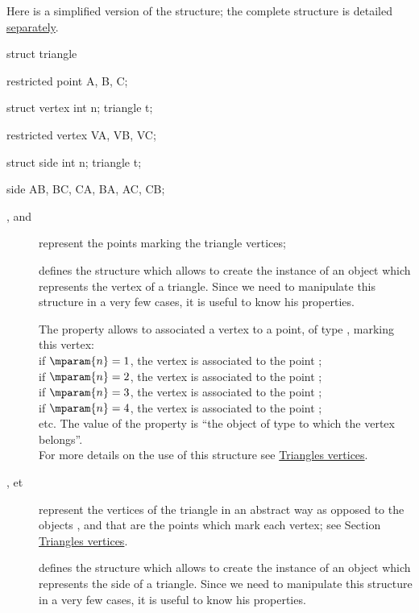 \documentclass[pdftex]{article}
\begin{document}
Here is a simplified version of the  structure; the
complete structure is detailed \href{http://piprim.tuxfamily.org/asymptote/geometry/modules/geometry.asy.index.sign.html#struct\%20triangle}{separately}.
\begin{center}
  \begin{Vcolor}
    struct triangle {
      restricted point A, B, C;

      struct vertex {
        int n;
        triangle t; }

      restricted vertex VA, VB, VC;

      struct side {
        int n;
        triangle t; }

      side AB, BC, CA, BA, AC, CB; }
  \end{Vcolor}
\end{center}
\begin{description}
\item[,  and ] represent the points marking
  the triangle vertices;
\item[] defines the  structure which
  allows to create the instance of an object which represents the
  vertex of a triangle. Since we need to manipulate this structure in
  a very few cases, it is useful to know his properties.

  The property  allows to associated a vertex to a point, of
  type , marking this vertex:\\
  if $\mparam{n}=1$, the vertex is associated to the
  point ;\\
  if $\mparam{n}=2$, the vertex is associated to the
  point ;\\
  if $\mparam{n}=3$, the vertex is associated to the
  point ;\\
  if $\mparam{n}=4$, the vertex is associated to the
  point ;\\
  etc.
  The value of the property  is ``the object of type
   to which the vertex belongs''.\\
  For more details on the use of this structure see
  \href{#subsection.vertex}{Triangles vertices}.
\item[,  et ] represent the vertices of
  the triangle in an abstract way as opposed to the objects
   ,  and  that are the points
  which mark each vertex; see Section
  \href{#subsection.vertex}{Triangles vertices}.
\item[] defines the  structure which
  allows to create the instance of an object which represents
  the side of a triangle. Since we need to manipulate this structure in
  a very few cases, it is useful to know his properties.


\end{description}
\end{document}
